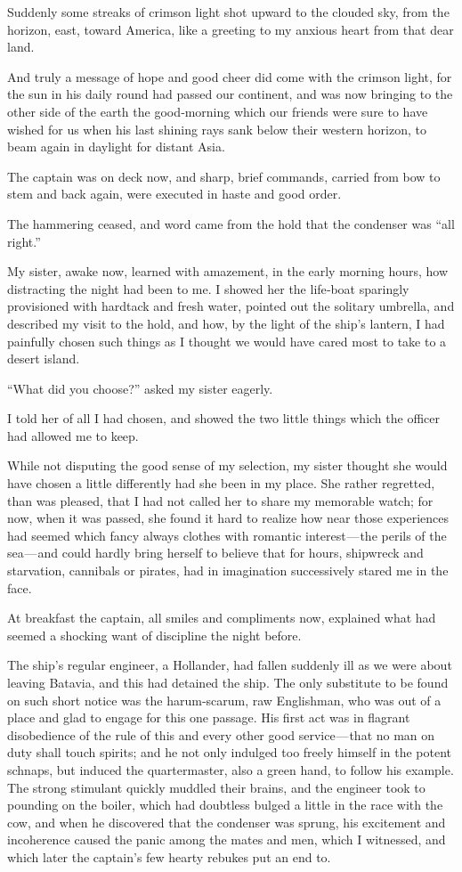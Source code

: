 \documentclass[12pt]{book}
\begin{document}
Suddenly some streaks of crimson light shot upward to the clouded sky, from
the horizon, east, toward America, like a greeting to my anxious heart from that
dear land.

And truly a message of hope and good cheer did come with the crimson light,
for the sun in his daily round had passed our continent, and was now bringing to
the other side of the earth the good‐morning which our friends were sure to have
wished for us when his last shining rays sank below their western horizon, to
beam again in daylight for distant Asia.

The captain was on deck now, and sharp, brief commands, carried from bow
to stem and back again, were executed in haste and good order.

The hammering ceased, and word came from the hold that the condenser was
“all right.”

My sister, awake now, learned with amazement, in the early morning hours,
how distracting the night had been to me. I showed her the life‐boat sparingly
provisioned with hardtack and fresh water, pointed out the solitary umbrella, and
described my visit to the hold, and how, by the light of the ship’s lantern, I had
painfully chosen such things as I thought we would have cared most to take to a
desert island.

“What did you choose?” asked my sister eagerly.

I told her of all I had chosen, and showed the two little things which the officer
had allowed me to keep.

While not disputing the good sense of my selection, my sister thought she
would have chosen a little differently had she been in my place. She rather regretted, than was pleased, that I had not called her to share my memorable watch;
for now, when it was passed, she found it hard to realize how near those experiences had seemed which fancy always clothes with romantic interest — the perils
of the sea — and could hardly bring herself to believe that for hours, shipwreck
and starvation, cannibals or pirates, had in imagination successively stared me in
the face.

At breakfast the captain, all smiles and compliments now, explained what had
seemed a shocking want of discipline the night before.

The ship’s regular engineer, a Hollander, had fallen suddenly ill as we were
about leaving Batavia, and this had detained the ship. The only substitute to be
found on such short notice was the harum‐scarum, raw Englishman, who was
out of a place and glad to engage for this one passage. His first act was in flagrant
disobedience of the rule of this and every other good service — that no man on
duty shall touch spirits; and he not only indulged too freely himself in the potent
schnaps, but induced the quartermaster, also a green hand, to follow his example.
The strong stimulant quickly muddled their brains, and the engineer took to
pounding on the boiler, which had doubtless bulged a little in the race with the
cow, and when he discovered that the condenser was sprung, his excitement and
incoherence caused the panic among the mates and men, which I witnessed, and
which later the captain’s few hearty rebukes put an end to.
\end{document}
